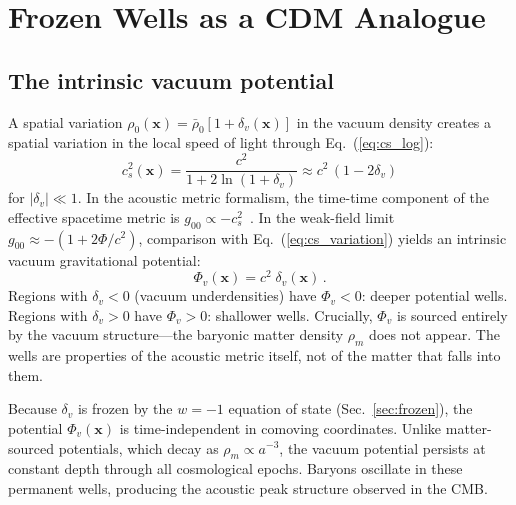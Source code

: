 \documentclass[12pt, a4paper]{article}
\begin{document}
\section{Frozen Wells as a CDM Analogue}
\label{sec:cdm_mimic}

\subsection{The intrinsic vacuum potential}

A spatial variation $\rho_0(\mathbf{x}) = \bar{\rho}_0[1 + \delta_v(\mathbf{x})]$ in the vacuum density creates a spatial variation in the local speed of light through Eq.~(\ref{eq:cs_log}):
\begin{equation}
    c_s^2(\mathbf{x}) = \frac{c^2}{1 + 2\ln(1+\delta_v)}
    \approx c^2\,(1 - 2\delta_v)
\label{eq:cs_variation}
\end{equation}
for $|\delta_v| \ll 1$. In the acoustic metric formalism, the time-time component of the effective spacetime metric is $g_{00} \propto -c_s^2$~\cite{visser_1998}. In the weak-field limit $g_{00} \approx -(1 + 2\Phi/c^2)$, comparison with Eq.~(\ref{eq:cs_variation}) yields an intrinsic vacuum gravitational potential:
\begin{equation}
    \Phi_v(\mathbf{x}) = c^2\;\delta_v(\mathbf{x})\,.
\label{eq:Phi_vac}
\end{equation}
Regions with $\delta_v < 0$ (vacuum underdensities) have $\Phi_v < 0$: deeper potential wells. Regions with $\delta_v > 0$ have $\Phi_v > 0$: shallower wells. Crucially, $\Phi_v$ is sourced entirely by the vacuum structure---the baryonic matter density $\rho_m$ does not appear. The wells are properties of the acoustic metric itself, not of the matter that falls into them.

Because $\delta_v$ is frozen by the $w = -1$ equation of state (Sec.~\ref{sec:frozen}), the potential $\Phi_v(\mathbf{x})$ is time-independent in comoving coordinates. Unlike matter-sourced potentials, which decay as $\rho_m \propto a^{-3}$, the vacuum potential persists at constant depth through all cosmological epochs. Baryons oscillate in these permanent wells, producing the acoustic peak structure observed in the CMB.
\end{document}
